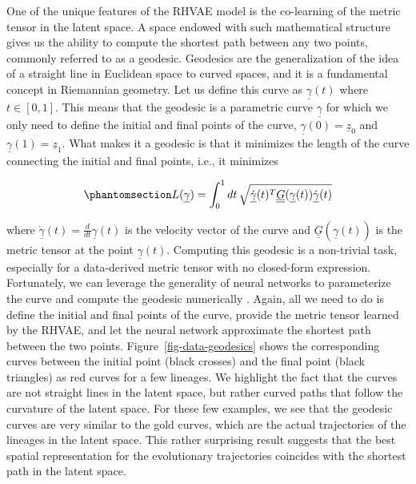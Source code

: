 \documentclass[
]{scrartcl}
\begin{document}
\begin{refsection}
One of the unique features of the RHVAE model is the co-learning of the
metric tensor in the latent space. A space endowed with such
mathematical structure gives us the ability to compute the shortest path
between any two points, commonly referred to as a geodesic. Geodesics
are the generalization of the idea of a straight line in Euclidean space
to curved spaces, and it is a fundamental concept in Riemannian
geometry. Let us define this curve as \(\underline{\gamma}(t)\) where
\(t \in [0, 1]\). This means that the geodesic is a parametric curve
\(\underline{\gamma}\) for which we only need to define the initial and
final points of the curve, \(\underline{\gamma}(0) = \underline{z}_0\)
and \(\underline{\gamma}(1) = \underline{z}_1\). What makes it a
geodesic is that it minimizes the length of the curve connecting the
initial and final points, i.e., it minimizes

\begin{equation}\phantomsection\label{eq-geodesic}{
L(\underline{\gamma}) = \int_0^1 
dt \,
\sqrt{
    \underline{\dot{\gamma}}(t)^T 
    \underline{\underline{G}}(\underline{\gamma}(t))
    \underline{\dot{\gamma}}(t)
}
}\end{equation}

where
\(\underline{\dot{\gamma}}(t) = \frac{d}{dt} \underline{\gamma}(t)\) is
the velocity vector of the curve and
\(\underline{\underline{G}}(\underline{\gamma}(t))\) is the metric
tensor at the point \(\underline{\gamma}(t)\). Computing this geodesic
is a non-trivial task, especially for a data-derived metric tensor with
no closed-form expression. Fortunately, we can leverage the generality
of neural networks to parameterize the curve and compute the geodesic
numerically \autocite{chen2018a}. Again, all we need to do is define the
initial and final points of the curve, provide the metric tensor learned
by the RHVAE, and let the neural network approximate the shortest path
between the two points. Figure~\ref{fig-data-geodesics} shows the
corresponding curves between the initial point (black crosses) and the
final point (black triangles) as red curves for a few lineages. We
highlight the fact that the curves are not straight lines in the latent
space, but rather curved paths that follow the curvature of the latent
space. For these few examples, we see that the geodesic curves are very
similar to the gold curves, which are the actual trajectories of the
lineages in the latent space. This rather surprising result suggests
that the best spatial representation for the evolutionary trajectories
coincides with the shortest path in the latent space.


\end{refsection}
\end{document}
